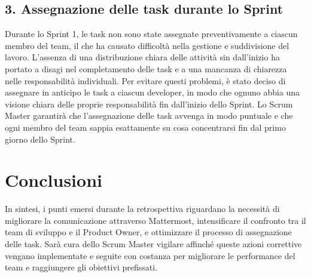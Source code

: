 \documentclass[a4paper,12pt]{article}
\begin{document}
\subsection*{3. Assegnazione delle task durante lo Sprint}
Durante lo Sprint 1, le task non sono state assegnate preventivamente a ciascun membro del team, il che ha causato difficoltà nella gestione e suddivisione del lavoro. L'assenza di una distribuzione chiara delle attività sin dall'inizio ha portato a disagi nel completamento delle task e a una mancanza di chiarezza nelle responsabilità individuali. Per evitare questi problemi, è stato deciso di assegnare in anticipo le task a ciascun developer, in modo che ognuno abbia una visione chiara delle proprie responsabilità fin dall'inizio dello Sprint. Lo Scrum Master garantirà che l'assegnazione delle task avvenga in modo puntuale e che ogni membro del team sappia esattamente su cosa concentrarsi fin dal primo giorno dello Sprint.

\section*{Conclusioni}
In sintesi, i punti emersi durante la retrospettiva riguardano la necessità di migliorare la comunicazione attraverso Mattermost, intensificare il confronto tra il team di sviluppo e il Product Owner, e ottimizzare il processo di assegnazione delle task. Sarà cura dello Scrum Master vigilare affinché queste azioni correttive vengano implementate e seguite con costanza per migliorare le performance del team e raggiungere gli obiettivi prefissati.
\end{document}
